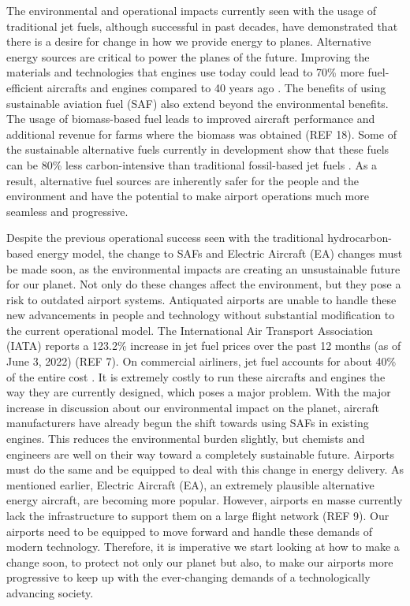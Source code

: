 \documentclass[../main.tex]{subfiles}
\begin{document}
The environmental and operational impacts currently seen with the usage of traditional jet fuels, although successful in past decades, have demonstrated that there is a desire for change in how we provide energy to planes. Alternative energy sources are critical to power the planes of the future. Improving the materials and technologies that engines use today could lead to 70\% more fuel-efficient aircrafts and engines compared to 40 years ago \cite{ref21}. The benefits of using sustainable aviation fuel (SAF) also extend beyond the environmental benefits. The usage of biomass-based fuel leads to improved aircraft performance and additional revenue for farms where the biomass was obtained (REF 18). Some of the sustainable alternative fuels currently in development show that these fuels can be 80\% less carbon-intensive  than traditional fossil-based jet fuels \cite{ref22}. As a result, alternative fuel sources are inherently safer for the people and the environment and have the potential to make airport operations much more seamless and progressive. \par 
Despite the previous operational success seen with the traditional hydrocarbon-based energy model, the change to SAFs and Electric Aircraft (EA) changes must be made soon, as the environmental impacts are creating an unsustainable future for our planet. Not only do these changes affect the environment, but they pose a risk to outdated airport systems. Antiquated airports are unable to handle these new advancements in people and technology without substantial modification to the current operational model. The International Air Transport Association (IATA) reports a 123.2\% increase in jet fuel prices over the past 12 months (as of June 3, 2022) (REF 7). On commercial airliners, jet fuel accounts for about 40\% of the entire cost \cite{ref23}.  It is extremely costly to run these aircrafts and engines the way they are currently designed, which poses a major problem.   With the major increase in discussion about our environmental impact on the planet, aircraft manufacturers have already begun the shift towards using SAFs in existing engines. This reduces the environmental burden slightly, but chemists and engineers are well on their way toward a completely sustainable future.  Airports must do the same and be equipped to deal with this change in energy delivery. As mentioned earlier, Electric Aircraft (EA), an extremely plausible alternative energy aircraft, are becoming more popular. However, airports en masse currently lack the infrastructure to support them on a large flight network (REF 9). Our airports need to be equipped to move forward and handle these demands of modern technology. Therefore, it is imperative we start looking at how to make a change soon, to protect not only our planet but also, to make our airports more progressive to keep up with the ever-changing demands of a technologically advancing society.\par  
\end{document}
